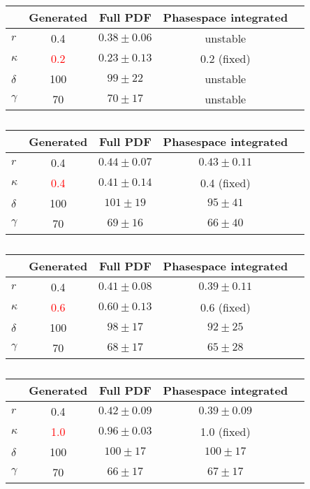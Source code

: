 \clearpage	

\begin{table}[h]
	\caption{} 		
  \scriptsize
  \centering
  \begin{tabular}
    {l c c c c}
    \hline \hline
    & Generated &  Full PDF     &   Phasespace integrated  \\   \hline
	$r$ & 0.4 & $0.38 \pm 0.06$   &  unstable \\
	$\kappa$  & \textcolor{red}{0.2} & $0.23 \pm 0.13$ & 0.2 (fixed)  \\
	$\delta$ & 100 & $99 \pm 22$ &  unstable\\
	$\gamma$ & 70 & $70 \pm 17$  & unstable \\
    \hline \hline
  \end{tabular}

  \begin{tabular}
    {l c c c c}
    \hline \hline
    & Generated &  Full PDF    &   Phasespace integrated  \\   \hline
	$r$ & 0.4 & $0.44 \pm 0.07$      & $0.43 \pm 0.11$  \\
	$\kappa$  & \textcolor{red}{0.4} &$0.41 \pm 0.14$  & 0.4 (fixed)  \\
	$\delta$ & 100 & $101 \pm 19$  & $95 \pm 41$ \\
	$\gamma$ & 70 & $69 \pm 16$   & $66 \pm 40 $ \\
    \hline \hline
  \end{tabular}

  \begin{tabular}
    {l c c c c}
    \hline \hline
    & Generated &  Full PDF    &   Phasespace integrated  \\   \hline
	$r$ & 0.4 & $0.41 \pm 0.08$     & $0.39 \pm 0.11$  \\
	$\kappa$  & \textcolor{red}{0.6} & $0.60 \pm 0.13$  & 0.6 (fixed)  \\
	$\delta$ & 100 & $98 \pm 17$ & $92 \pm 25$ \\
	$\gamma$ & 70 & $68 \pm 17$ & $65 \pm 28$ \\
    \hline \hline
  \end{tabular}

  \begin{tabular}
    {l c c c c}
    \hline \hline
    & Generated &  Full PDF        &   Phasespace integrated  \\   \hline
	$r$ & 0.4 & $0.42 \pm 0.09$    &  $0.39 \pm 0.09$ \\
	$\kappa$  & \textcolor{red}{1.0} & $0.96 \pm 0.03$ &  1.0 (fixed)  \\
	$\delta$ & 100 & $100 \pm 17$ &  $100 \pm 17$  \\
	$\gamma$ & 70 & $66 \pm 17$ & $67 \pm 17$  \\
    \hline \hline
  \end{tabular}
\end{table}
